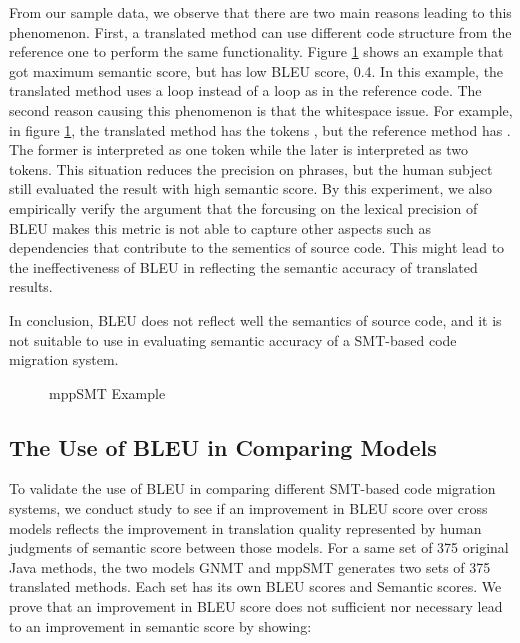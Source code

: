 From our sample data, we observe that there are two main reasons leading 
to this phenomenon.
%
First, a translated method can use different code structure from the 
reference one to perform the same functionality. Figure \ref{fig:mppSMT_example} shows an example
that got maximum semantic score, but has low BLEU score, 0.4. In this example, 
the translated method uses a  loop instead of a  
loop as in the reference code. The second reason causing this phenomenon 
is that the whitespace issue. For example, in figure \ref{fig:mppSMT_example}, the translated method has the 
tokens , but the reference method has . The former 
is interpreted as one token while the later is interpreted as two tokens. 
This situation reduces the precision on phrases, but the human subject still
evaluated the result with high semantic score. By this experiment, we also empirically 
verify the argument that the forcusing on the lexical precision of BLEU makes
this metric is not able to capture other aspects such as dependencies 
that contribute to the sementics of source code. This might lead to the ineffectiveness
of BLEU in reflecting the semantic accuracy of translated results. 

In conclusion, BLEU does not reflect well the
semantics of source code, and it is not suitable to use in evaluating
semantic accuracy of a SMT-based code migration system.

\begin{figure}[t]
\centering

\caption{mppSMT Example}
\label{fig:mppSMT_example}
\end{figure}


\subsection{The Use of BLEU in Comparing Models}
To validate the use of BLEU in comparing different SMT-based code migration systems, we conduct study to see if an improvement in BLEU score over cross models reflects the improvement in translation quality represented by human judgments of semantic score between those models. For a same set of 375 original Java methods, the two models GNMT and mppSMT generates two sets of 375 translated methods. Each set has its own BLEU scores and Semantic scores.
We prove that an improvement in BLEU score does not sufficient nor necessary lead to an improvement in semantic score by showing:

